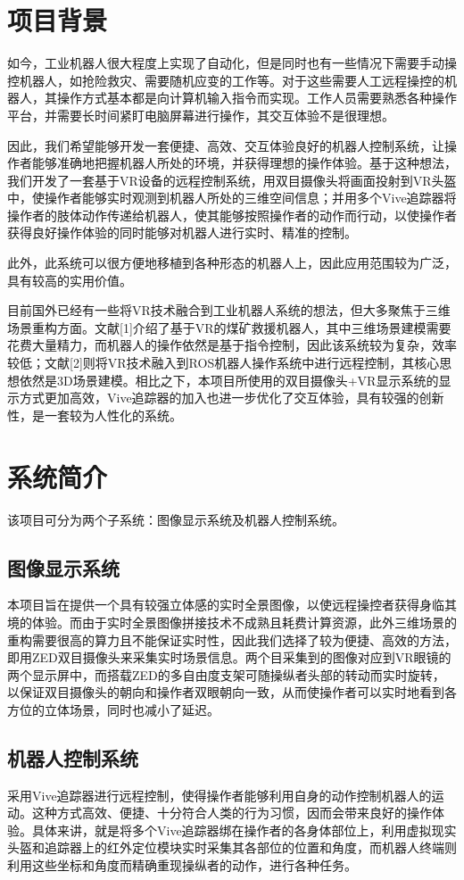 \chapter{项目背景}

如今，工业机器人很大程度上实现了自动化，但是同时也有一些情况下需要手动操控机器人，如抢险救灾、需要随机应变的工作等。对于这些需要人工远程操控的机器人，其操作方式基本都是向计算机输入指令而实现。工作人员需要熟悉各种操作平台，并需要长时间紧盯电脑屏幕进行操作，其交互体验不是很理想。

因此，我们希望能够开发一套便捷、高效、交互体验良好的机器人控制系统，让操作者能够准确地把握机器人所处的环境，并获得理想的操作体验。基于这种想法，我们开发了一套基于VR设备的远程控制系统，用双目摄像头将画面投射到VR头盔中，使操作者能够实时观测到机器人所处的三维空间信息；并用多个Vive追踪器将操作者的肢体动作传递给机器人，使其能够按照操作者的动作而行动，以使操作者获得良好操作体验的同时能够对机器人进行实时、精准的控制。

此外，此系统可以很方便地移植到各种形态的机器人上，因此应用范围较为广泛，具有较高的实用价值。

目前国外已经有一些将VR技术融合到工业机器人系统的想法，但大多聚焦于三维场景重构方面。文献[1]介绍了基于VR的煤矿救援机器人，其中三维场景建模需要花费大量精力，而机器人的操作依然是基于指令控制，因此该系统较为复杂，效率较低；文献[2]则将VR技术融入到ROS机器人操作系统中进行远程控制，其核心思想依然是3D场景建模。相比之下，本项目所使用的双目摄像头+VR显示系统的显示方式更加高效，Vive追踪器的加入也进一步优化了交互体验，具有较强的创新性，是一套较为人性化的系统。

\chapter{系统简介}
	该项目可分为两个子系统：图像显示系统及机器人控制系统。
	\section{图像显示系统}
	本项目旨在提供一个具有较强立体感的实时全景图像，以使远程操控者获得身临其境的体验。而由于实时全景图像拼接技术不成熟且耗费计算资源，此外三维场景的重构需要很高的算力且不能保证实时性，因此我们选择了较为便捷、高效的方法，即用ZED双目摄像头来采集实时场景信息。两个目采集到的图像对应到VR眼镜的两个显示屏中，而搭载ZED的多自由度支架可随操纵者头部的转动而实时旋转，以保证双目摄像头的朝向和操作者双眼朝向一致，从而使操作者可以实时地看到各方位的立体场景，同时也减小了延迟。
	\section{机器人控制系统}
	采用Vive追踪器进行远程控制，使得操作者能够利用自身的动作控制机器人的运动。这种方式高效、便捷、十分符合人类的行为习惯，因而会带来良好的操作体验。具体来讲，就是将多个Vive追踪器绑在操作者的各身体部位上，利用虚拟现实头盔和追踪器上的红外定位模块实时采集其各部位的位置和角度，而机器人终端则利用这些坐标和角度而精确重现操纵者的动作，进行各种任务。




